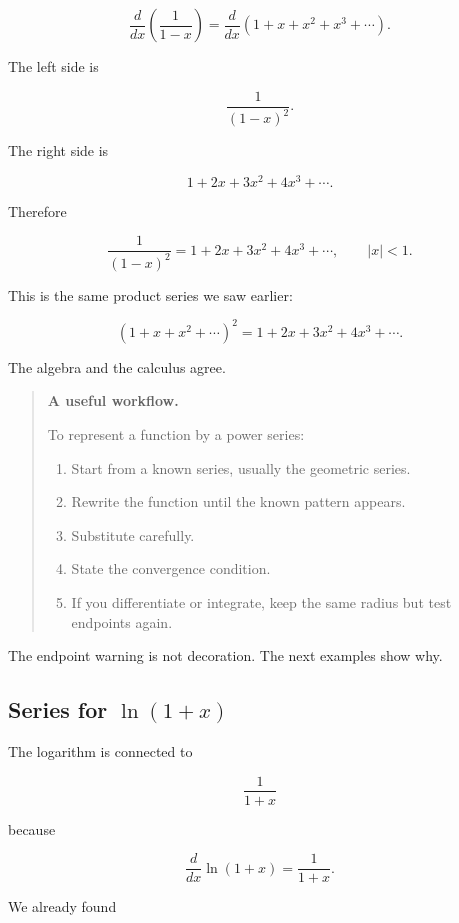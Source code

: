 \[
\frac{d}{dx}\left(\frac1{1-x}\right)
=
\frac{d}{dx}\left(1+x+x^2+x^3+\cdots\right).
\]

The left side is

\[
\frac1{(1-x)^2}.
\]

The right side is

\[
1+2x+3x^2+4x^3+\cdots.
\]

Therefore

\[
\boxed{
\frac1{(1-x)^2}
=
1+2x+3x^2+4x^3+\cdots,
\qquad |x|<1.
}
\]

This is the same product series we saw earlier:

\[
(1+x+x^2+\cdots)^2
=
1+2x+3x^2+4x^3+\cdots.
\]

The algebra and the calculus agree.

\begin{quote}
\textbf{A useful workflow.}

To represent a function by a power series:

\begin{enumerate}
\item Start from a known series, usually the geometric series.

\item Rewrite the function until the known pattern appears.

\item Substitute carefully.

\item State the convergence condition.

\item If you differentiate or integrate, keep the same radius but test endpoints again.
\end{enumerate}
\end{quote}

The endpoint warning is not decoration.  The next examples show why.

\subsection{\texorpdfstring{Series for \(\ln(1+x)\)}{Series for ln(1+x)}}
\label{subsec:series-for-log-one-plus-x}

The logarithm is connected to

\[
\frac1{1+x}
\]

because

\[
\frac{d}{dx}\ln(1+x)=\frac1{1+x}.
\]

We already found

